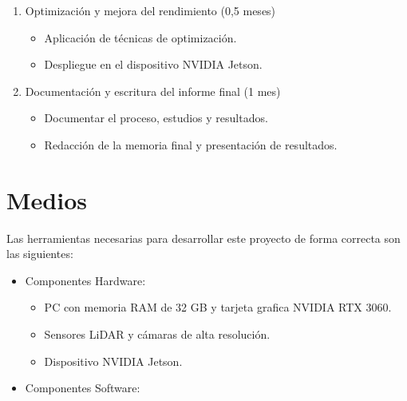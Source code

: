 \begin{enumerate}
\item Optimización y mejora del rendimiento (0,5 meses)
	\begin{itemize}
		\item Aplicación de técnicas de optimización.
		\item Despliegue en el dispositivo NVIDIA Jetson.
	\end{itemize}

\item Documentación y escritura del informe final (1 mes)
	\begin{itemize}
		\item Documentar el proceso, estudios y resultados.
		\item Redacción de la memoria final y presentación de resultados.
	\end{itemize}

\end{enumerate}


\section{Medios}
\label{sec:medios}

Las herramientas necesarias para desarrollar este proyecto de forma correcta
son las siguientes:
\begin{itemize}

\item Componentes Hardware:
	\begin{itemize}
	\item PC con memoria RAM de 32 GB y tarjeta grafica NVIDIA RTX 3060.
	\item Sensores LiDAR y cámaras de alta resolución.
	\item Dispositivo NVIDIA Jetson.
	\end{itemize}

\item Componentes Software:

\end{itemize}


